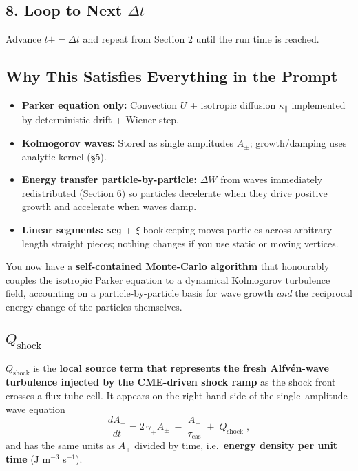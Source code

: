 \subsection*{8. Loop to Next $\Delta t$}

Advance $t += \Delta t$ and repeat from Section 2 until the run time is reached.

\subsection*{Why This Satisfies Everything in the Prompt}

\begin{itemize}
\item \textbf{Parker equation only:} Convection $U$ + isotropic diffusion $\kappa_\parallel$ implemented by deterministic drift + Wiener step.
\item \textbf{Kolmogorov waves:} Stored as single amplitudes $A_\pm$; growth/damping uses analytic kernel (\S 5).
\item \textbf{Energy transfer particle-by-particle:} $\Delta W$ from waves immediately redistributed (Section 6) so particles decelerate when they drive positive growth and accelerate when waves damp.
\item \textbf{Linear segments:} \texttt{seg} + $\xi$ bookkeeping moves particles across arbitrary-length straight pieces; nothing changes if you use static or moving vertices.
\end{itemize}

\bigskip

\noindent
You now have a \textbf{self-contained Monte-Carlo algorithm} that honourably couples the isotropic Parker equation to a dynamical Kolmogorov turbulence field, accounting on a particle-by-particle basis for wave growth \emph{and} the reciprocal energy change of the particles themselves.

\subsection{$Q_{\text{shock}}$}

\textbf{$Q_{\text{shock}}$} is the \textbf{local source term that represents the fresh Alfvén-wave turbulence injected by the CME-driven shock ramp} as the shock front crosses a flux-tube cell.
It appears on the right-hand side of the single–amplitude wave equation
\[
\frac{dA_\pm}{dt}
= 2\,\gamma_\pm A_\pm
  \;-\;\frac{A_\pm}{\tau_{\text{cas}}}
  \;+\;\boxed{Q_{\text{shock}}}\;,
\]
and has the same units as $A_\pm$ divided by time, i.e.\ \textbf{energy density per unit time} (J m$^{-3}$ s$^{-1}$).


